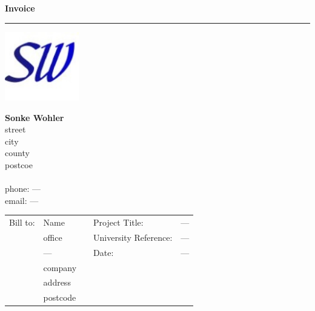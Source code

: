 \documentclass{letter}
\begin{document}
  \hfill \LARGE \textbf{Invoice}  \normalsize 
  \color{myBlue}  \rule{\textwidth}{3pt}  \color{black}
  \vspace{3pt}

  \begin{minipage}{0.2\textwidth}
    \includegraphics[height=3cm]{myLogo.jpg} 
  \end{minipage}
  \hspace{0.5cm}
  \begin{minipage}{0.4\textwidth}
    \Large
    \textbf{Sonke Wohler}  \vspace{3pt}  \\
    \large
    street  \\
    city  \\
    county  \vspace{2pt}  \\
    postcoe  \\\\
    phone: ---  \\
    email: ---
  \end{minipage}
  \hfill
  \begin{minipage}{0.1\textwidth}
  \end{minipage}

  \vspace{20pt}

  \begin{tabular}{ p{}  p{} p{}  p{}  p{} }
    Bill to: & \large Name \normalsize & & Project Title: & --- \\
             & office & & University Reference: & --- \\
             & --- & & Date: & --- \\
             & company & & & \\
             & address & & & \\
             & postcode & & & \\
  \end{tabular}

  \vspace{20pt}  \hfill
\end{document}
